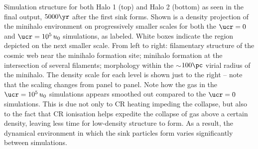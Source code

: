 \label{fig:structure}
Simulation structure for both Halo 1 (top) and Halo 2 (bottom) as seen in the final output, $5000\yr$ after the first sink forms.  
Shown is a density projection of the minihalo environment on progressively smaller scales for both the $\ucr=0$ and $\ucr=10^5\,u_0$ simulations, as labeled.  
White boxes indicate the region depicted on the next smaller scale.  
From left to right: filamentary structure of the cosmic web near the minihalo formation site; minihalo formation at the intersection of several filaments; morphology within the $\sim$$100\pc$ virial radius of the minihalo. 
The density scale for each level is shown just to the right -- note that the scaling changes from panel to panel. Note how the gas in the $\ucr=10^5\,u_0$ simulations appears smoothed out compared to the $\ucr=0$ simulations.  
This is due not only to CR heating impeding the collapse, but also to the fact that CR ionisation helps expedite the collapse of gas above a certain density, leaving less time for low-density structure to form.  
As a result, the dynamical environment in which the sink particles form varies significantly between simulations.